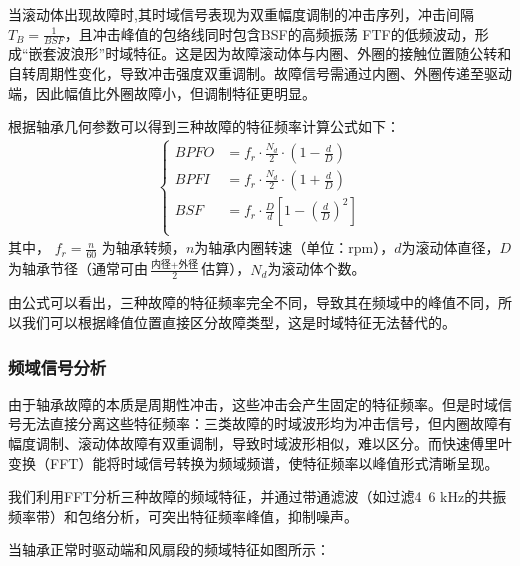 \documentclass[a4paper]{CPIPC}
\numberwithin{equation}{section}
\begin{document}
当滚动体出现故障时,其时域信号表现为双重幅度调制的冲击序列，冲击间隔${T_B} =  \tfrac{1}{BSF}$，且冲击峰值的包络线同时包含BSF的高频振荡
FTF的低频波动，形成“嵌套波浪形”时域特征。这是因为故障滚动体与内圈、外圈的接触位置随公转和自转周期性变化，导致冲击强度双重调制。故障信号需通过内圈、外圈传递至驱动端，因此幅值比外圈故障小，但调制特征更明显\cite{ref3}。

根据轴承几何参数可以得到三种故障的特征频率计算公式如下：
\begin{align}
    \left\{
    \begin{aligned}
    BPFO &= f_r \cdot \frac{N_d}{2} \cdot \left(1 - \frac{d}{D}\right) \\
    BPFI &=f_r \cdot \frac{N_d}{2} \cdot \left(1 + \frac{d}{D}\right)    \\
    BSF  &=f_r \cdot \frac{D}{d}\left[1 - \left(\frac{d}{D}\right)^2\right]\\
    \end{aligned} 
    \right.
\end{align}
其中， $f_r = \frac{n}{60}$ 为轴承转频，$n$为轴承内圈转速（单位：rpm），$d$为滚动体直径，$D$为轴承节径（通常可由$\frac{\text{内径} + \text{外径}}{2}$估算），$N_d$为滚动体个数。

由公式可以看出，三种故障的特征频率完全不同，导致其在频域中的峰值不同，所以我们可以根据峰值位置直接区分故障类型，这是时域特征无法替代的。

\subsubsection{频域信号分析}

由于轴承故障的本质是周期性冲击，这些冲击会产生固定的特征频率。但是时域信号无法直接分离这些特征频率：三类故障的时域波形均为冲击信号，但内圈故障有幅度调制、滚动体故障有双重调制，导致时域波形相似，难以区分。而快速傅里叶变换（FFT）能将时域信号转换为频域频谱，使特征频率以峰值形式清晰呈现。

我们利用FFT分析三种故障的频域特征，并通过带通滤波（如过滤4~6 kHz的共振频率带）和包络分析，可突出特征频率峰值，抑制噪声。

当轴承正常时驱动端和风扇段的频域特征如图所示：
\end{document}
